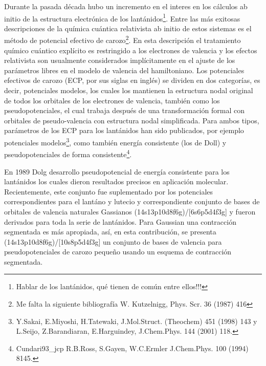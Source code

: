 Durante la pasada d\'ecada hubo un incremento en el interes en los 
c\'alculos ab initio de la estructura electr\'onica de los 
lant\'anidos\footnote{Hablar de los lant\'anidos, qu\'e tienen de
com\'un entre ellos!!!}. Entre las m\'as exitosas descripciones de la
qu\'imica cu\'antica relativista ab initio de estos sistemas es el 
m\'etodo de potencial efectivo de carozo\footnote{ Me falta la 
siguiente bibliograf\'ia W. Kutzelnigg, Phys. Scr. 36 (1987) 416}.
En esta descripci\'on el tratamiento qu\'imico cu\'antico expl\'icito
es restringido a los electrones de valencia y los efectos relativista
son usualmente considerados impl\'icitamente en el ajuste de los
par\'ametros libres en el modelo de valencia del hamiltoniano. Los 
potenciales efectivos de carozo (ECP, por sus siglas en ingl\'es) se
dividen en dos categor\'ias, es decir, potenciales modelos, los 
cuales los mantienen la estructura nodal original de todos los 
orbitales de los electrones de valencia, tambi\'en como los 
pseudopotenciales, el cual trabaja despu\'es de una transformaci\'on
formal con orbitales de pseudo-valencia con estructura nodal 
simplificada. Para ambos tipos, par\'ametros de los ECP para los 
lant\'anidos han sido publicados, por ejemplo potenciales 
modelos\footnote{Y.Sakai, E.Miyoshi, H.Tatewaki, J.Mol.Struct.
(Theochem) 451 (1998) 143 y \n
L.Seijo, Z.Barandiaran, E.Harguindey, J.Chem.Phys. 144 (2001) 118.},
como tambi\'en  energ\'ia consistente (los de Doll) y 
pseudopotenciales de forma consistente\footnote{Cundari93_jcp \n
R.B.Ross, S.Gayen, W.C.Ermler J.Chem.Phys. 100 (1994) 8145.}.

En 1989 Dolg desarrollo pseudopotencial de energ\'ia consistente para
los lant\'anidos los cuales dieron resultados precisos en 
aplicaci\'on molecular. Recientemente, este conjunto fue suplementado
por los potenciales correspondientes para el lant\'ano y lutecio y
correspondiente conjunto de bases de orbitales de valencia naturales
Gassianos (14s13p10d8f6g)/[6s6p5d4f3g] y fueron derivados para toda 
la  serie de lant\'anidos. Para Gaussian una contracci\'on segmentada
es m\'as apropiada, as\'i, en esta contribuci\'on, se presenta
(14s13p10d8f6g)/[10s8p5d4f3g] un conjunto de bases de valencia para
pseudopotenciales de  carozo peque\~no usando un esquema de 
contracci\'on segmentada.

